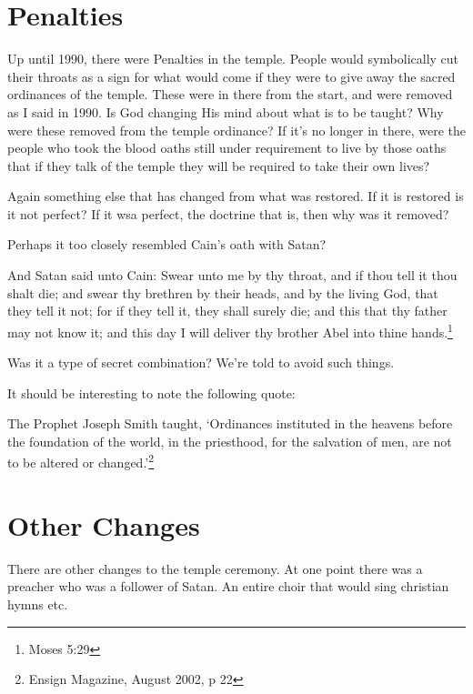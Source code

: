 \section{Penalties}

Up until 1990, there were Penalties in the temple. People would symbolically cut
their throats as a sign for what would come if they were to give away the sacred
ordinances of the temple. These were in there from the start, and were removed
as I said in 1990. Is God changing His mind about what is to be taught? Why were
these removed from the temple ordinance? If it's no longer in there, were the
people who took the blood oaths still under requirement to live by those oaths
that if they talk of the temple they will be required to take their own lives?

Again something else that has changed from what was restored. If it is restored
is it not perfect? If it wsa perfect, the doctrine that is, then why was it
removed?

Perhaps it too closely resembled Cain's oath with Satan?

\begin{displayquote}
And Satan said unto Cain: Swear unto me by thy throat, and if thou tell it thou 
shalt die; and swear thy brethren by their heads, and by the living God, that 
they tell it not; for if they tell it, they shall surely die; and this that thy 
father may not know it; and this day I will deliver thy brother Abel into thine 
hands.\footnote{Moses 5:29}
\end{displayquote}

Was it a type of secret combination? We're told to avoid such things.

It should be interesting to note the following quote:

\begin{displayquote}
The Prophet Joseph Smith taught, `Ordinances instituted in the heavens before 
the foundation of the world, in the priesthood, for the salvation of men, 
are not to be altered or changed.'\footnote{Ensign Magazine, August 2002, p 22}
\end{displayquote}

\section{Other Changes}

There are other changes to the temple ceremony. At one point there was a
preacher who was a follower of Satan. An entire choir that would sing christian
hymns etc.

